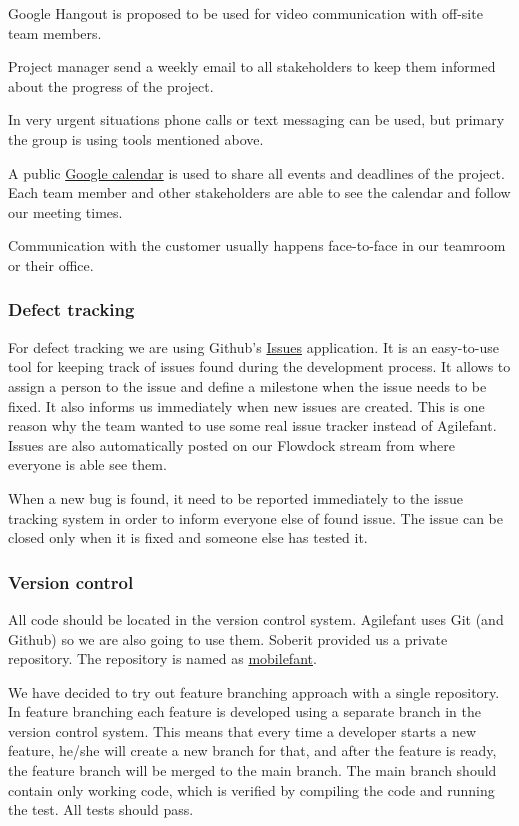 Google Hangout is proposed to be used for video communication with off-site team
members.

Project manager send a weekly email to all stakeholders to keep them informed
about the progress of the project.

In very urgent situations phone calls or text messaging can be used, but primary
the group is using tools mentioned above.

A public \href{http://tinyurl.com/mobilefant}{Google calendar} is used to share
all events and deadlines of the project. Each team member and other stakeholders
are able to see the calendar and follow our meeting times.

Communication with the customer usually happens face-to-face in our teamroom or
their office.

\subsubsection{Defect tracking}

For defect tracking we are using Github's
\href{https://github.com/soberit/mobilefant/issues}{Issues} application. It is
an easy-to-use tool for keeping track of issues found during the development
process. It allows to assign a person to the issue and define a milestone when
the issue needs to be fixed. It also informs us immediately when new issues are
created. This is one reason why the team wanted to use some real issue tracker
instead of Agilefant. Issues are also automatically posted on our Flowdock
stream from where everyone is able see them.

When a new bug is found, it need to be reported immediately to the issue
tracking system in order to inform everyone else of found issue. The issue can
be closed only when it is fixed and someone else has tested it.

\subsubsection{Version control}

All code should be located in the version control system. Agilefant uses Git
(and Github) so we are also going to use them. Soberit provided us a private
repository. The repository is named as
\href{https://github.com/soberit/mobilefant}{mobilefant}.

We have decided to try out feature branching approach with a single repository.
In feature branching each feature is developed using a separate branch in the
version control system. This means that every time a developer starts a new
feature, he/she will create a new branch for that, and after the feature is
ready, the feature branch will be merged to the main branch. The main branch
should contain only working code, which is verified by compiling the code and
running the test. All tests should pass.

